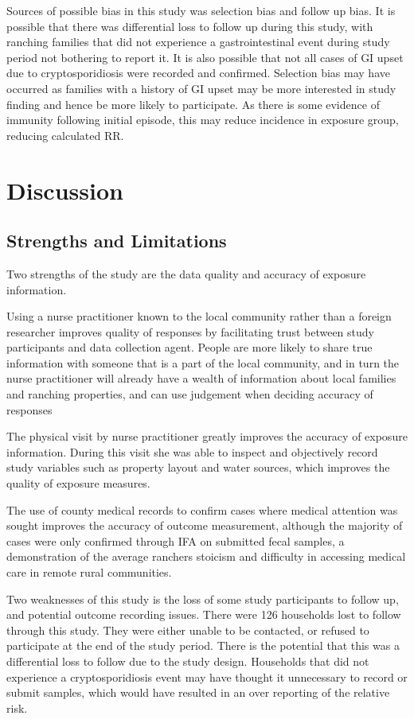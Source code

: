 \documentclass[12pt]{article}
\begin{document}
		Sources of possible bias in this study was selection bias and follow up bias.
		It is possible that there was differential loss to follow up during this study, with ranching families that did not experience a gastrointestinal event during study period not bothering to report it.
		It is also possible that not all cases of GI upset due to cryptosporidiosis were recorded and confirmed. 
		Selection bias may have occurred as families with a history of GI upset may be more interested in study finding and hence be more likely to participate. As there is some evidence of immunity following initial episode, this may reduce incidence in exposure group, reducing calculated RR.


	\section{Discussion} 


	\subsection{Strengths and Limitations}
		Two strengths of the study are the data quality and accuracy of exposure information.

		Using a nurse practitioner known to the local community rather than a foreign researcher improves quality of responses by facilitating trust between study participants and data collection agent. 
		People are more likely to share true information with someone that is a part of the local community, and in turn the nurse practitioner will already have a wealth of information about local families and ranching properties, and can use judgement when deciding accuracy of responses


		The physical visit by nurse practitioner greatly improves the accuracy of exposure information. 
		During this visit she was able to inspect and objectively record study variables such as property layout and water sources, which improves the quality of exposure measures.


		The use of county medical records to confirm cases where medical attention was sought improves the accuracy of outcome measurement, although the majority of cases were only confirmed through IFA on submitted fecal samples, a demonstration of the average ranchers stoicism and difficulty in accessing medical care in remote rural communities. 

		Two weaknesses of this study is the loss of some study participants to follow up, and potential outcome recording issues.
		There were 126 households lost to follow through this study. They were either unable to be contacted, or refused to participate at the end of the study period. There is the potential that this was a differential loss to follow due to the study design. 
		Households that did not experience a cryptosporidiosis event may have thought it unnecessary to record or submit samples, which would have resulted in an over reporting of the relative risk.
\end{document}
